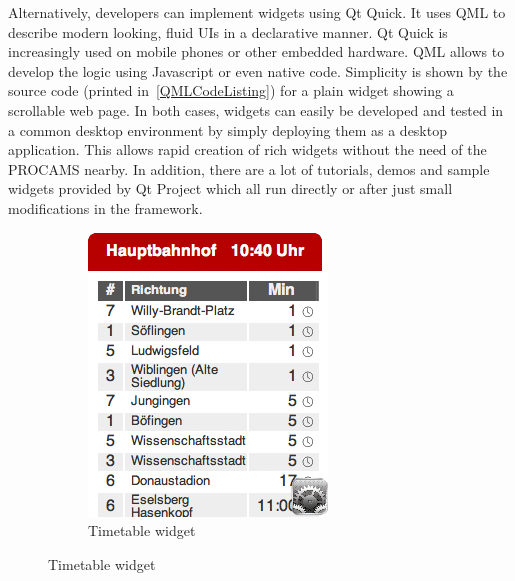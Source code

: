 Alternatively, developers can implement widgets using \ac{Qt Quick}. It uses QML to describe modern looking, fluid UIs in a declarative manner. Qt Quick is increasingly used on mobile phones or other embedded hardware.
QML allows to develop the logic using Javascript or even native code. Simplicity is shown by the source code (printed in~\autoref{QMLCodeListing}) for a plain widget showing a scrollable web page.
In both cases, widgets can easily be developed and tested in a common desktop environment by simply deploying them as a desktop application. This allows rapid creation of rich widgets without the need of the PROCAMS nearby. In addition, there are a lot of tutorials, demos and sample widgets provided by Qt Project \cite{Digia:BVAEvJrQ} which all run directly or after just small modifications in the framework.
\begin{figure}[htbp]
        \centering
        \begin{subfigure}[b]{0.235\textwidth}
                \includegraphics[width=\textwidth]{images/software/bus.png}
                \caption{Timetable widget}
                \label{img:wid:bus}
        \end{subfigure}

\end{figure}
